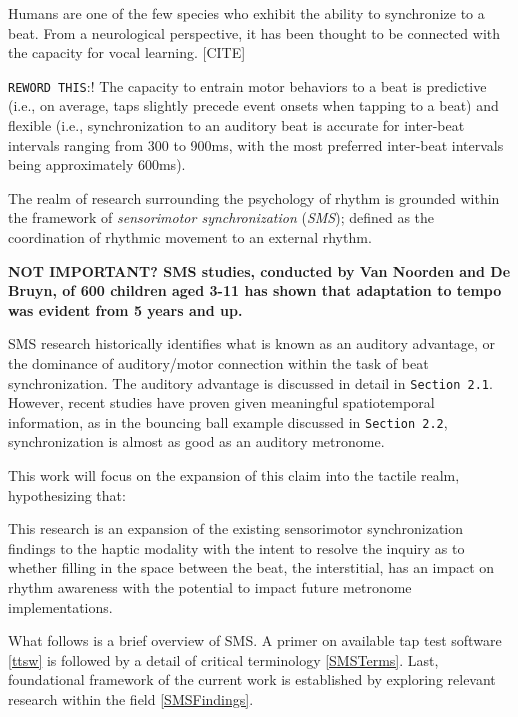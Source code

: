 Humans are one of the few species who exhibit the ability to synchronize to a beat. From a neurological perspective, it has been thought to be connected with the capacity for vocal learning. [CITE]

\verb!REWORD THIS!:!
The capacity to entrain motor behaviors to a beat is predictive (i.e., on average, taps slightly precede event onsets when tapping to a beat) and flexible (i.e., synchronization to an auditory beat is accurate for inter-beat intervals ranging from 300 to 900ms, with the most preferred inter-beat intervals being approximately 600ms).~\cite{repp2013sensorimotor}

The realm of research surrounding the psychology of rhythm is grounded within the framework of \textit{sensorimotor synchronization} (\textit{SMS}); defined as the coordination of rhythmic movement to an external rhythm. 

\textbf{NOT IMPORTANT? SMS studies, conducted by Van Noorden and De Bruyn, of 600 children aged 3-11 has shown that adaptation to tempo was evident from 5 years and up. \cite{repp2013sensorimotor} }

SMS research historically identifies what is known as an auditory advantage, or the dominance of auditory/motor connection within the task of beat synchronization. The auditory advantage is discussed in detail in \verb!Section 2.1!. However, recent studies have proven given meaningful spatiotemporal information, as in the bouncing ball example discussed in \verb!Section 2.2!, synchronization is almost as good as an auditory metronome.

This work will focus on the expansion of this claim into the tactile realm, hypothesizing that:

This research is an expansion of the existing sensorimotor synchronization findings to the haptic modality with the intent to resolve the inquiry as to whether filling in the space between the beat, the interstitial, has an impact on rhythm awareness with the potential to impact future metronome implementations. 

What follows is a brief overview of SMS. A primer on available tap test software \ref{ttsw} is followed by a detail of critical terminology \ref{SMSTerms}. Last, foundational framework of the current work is established by exploring relevant research within the field \ref{SMSFindings}.

